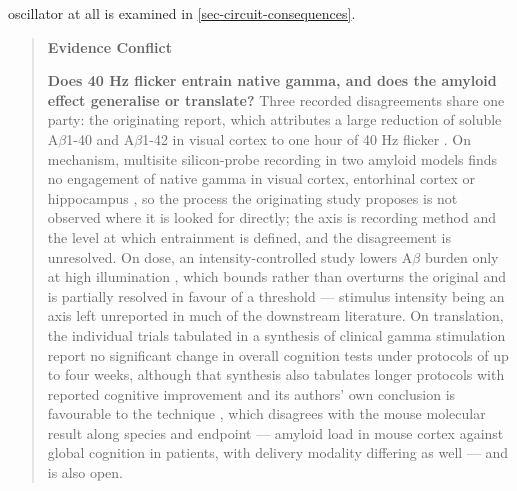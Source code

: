 \documentclass[11pt]{article}
\begin{document}
oscillator at all is examined in \ref{sec-circuit-consequences}.

\begin{quote}
\noindent\textbf{Evidence Conflict}\par
\textbf{Does 40 Hz flicker entrain native gamma, and does the amyloid effect generalise or translate?} Three recorded disagreements share one party: the originating report, which attributes a large reduction of soluble A$\beta$1-40 and A$\beta$1-42 in visual cortex to one hour of 40 Hz flicker \citep{Iaccarino2016}. On mechanism, multisite silicon-probe recording in two amyloid models finds no engagement of native gamma in visual cortex, entorhinal cortex or hippocampus \citep{Soula2023}, so the process the originating study proposes \citep{Iaccarino2016} is not observed where it is looked for directly; the axis is recording method and the level at which entrainment is defined, and the disagreement is unresolved. On dose, an intensity-controlled study lowers A$\beta$ burden only at high illumination \citep{Gu2026}, which bounds rather than overturns the original \citep{Iaccarino2016} and is partially resolved in favour of a threshold --- stimulus intensity being an axis left unreported in much of the downstream literature. On translation, the individual trials tabulated in a synthesis of clinical gamma stimulation report no significant change in overall cognition tests under protocols of up to four weeks, although that synthesis also tabulates longer protocols with reported cognitive improvement and its authors' own conclusion is favourable to the technique \citep{DePaolis2024}, which disagrees with the mouse molecular result \citep{Iaccarino2016} along species and endpoint --- amyloid load in mouse cortex against global cognition in patients, with delivery modality differing as well --- and is also open.

\end{quote}
\end{document}
